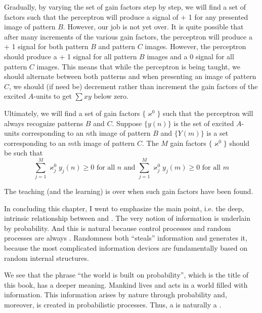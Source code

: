 Gradually, by varying the set of gain factors step by step, we will find
a set of factors such that the perceptron will produce a signal of + 1 for
any presented image of pattern $B$. However, our job is not yet over. It is
quite possible that after many increments of the various gain factors, the
perceptron will produce a + 1 signal for both pattern $B$ and pattern
$C$ images. However, the perceptron should produce a + 1 signal for all
pattern $B$ images and a 0 signal for all pattern $C$ images. This means
that while the perceptron is being taught, we should alternate between
both patterns and when presenting an image of pattern $C$, we should (if
need be) decrement rather than increment the gain factors of the excited
$A$-units to get $\sum x y$ below zero.

Ultimately, we will find a set of gain factors  $\{ \varkappa^{0} \}$ such that the perceptron will always recognize patterns $B$ and $C$. Suppose  $\{ y(n) \}$ is the set of excited $A$-units corresponding to an $n$th image of pattern
$B$ and  $\{ Y(m) \}$ is a set corresponding to an $m$th image of pattern $C$. The $M$ gain factors $\{ \varkappa^{0} \}$ should be such that 
\begin{equation*}
\sum_{j= 1}^{M} \varkappa^{0}_{j} y_{j} (n)  \geqslant 0 \,\, \text{for all} \,\, n \,\, \text{and} \,\,
\sum_{j= 1}^{M} \varkappa^{0}_{j} y_{j} (m)  \geqslant 0 \,\, \text{for all} \,\, m
\end{equation*}

The teaching (and the learning) is over when such gain factors have been found.

 In concluding this chapter, I went to emphasize the main
point, i.e. the deep, intrinsic relationship between  and . The very notion of information is underlain by
probability. And this is natural because control processes and random
processes are always . Randomness both ``steals''
information and generates it, because the most complicated information
devices are fundamentally based on random internal structures.

We see that the phrase ``the world is built on probability'', which is
the title of this book, has a deeper meaning. Mankind lives and acts in
a world filled with information. This information arises by nature
through probability and, moreover, is created in probabilistic processes.
Thus, a  is naturally a .
